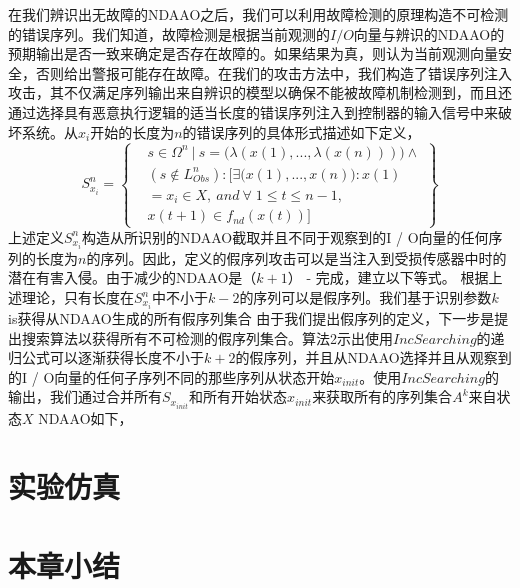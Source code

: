在我们辨识出无故障的NDAAO之后，我们可以利用故障检测的原理构造不可检测的错误序列。我们知道，故障检测是根据当前观测的$I/O$向量与辨识的NDAAO的预期输出是否一致来确定是否存在故障的。如果结果为真，则认为当前观测向量安全，否则给出警报可能存在故障。在我们的攻击方法中，我们构造了错误序列注入攻击，其不仅满足序列输出来自辨识的模型以确保不能被故障机制检测到，而且还通过选择具有恶意执行逻辑的适当长度的错误序列注入到控制器的输入信号中来破坏系统。从$ x_i $开始的长度为$ n $的错误序列的具体形式描述如下定义，
\begin{equation} 
S_{x_i}^{n}=\left\{\begin{split} &s\in \Omega^n~|~s=\big( \lambda(x(1),...,\lambda(x(n))) \big)\wedge\\
&(s\notin L_{Obs}^n):[\exists \big(x(1),...,x(n)\big): x(1)\\&=x_i\in X,~and~
\forall\;1\leq t\leq n-1,\\&x(t+1)\in f_{nd}(x(t))] \end{split} \right\} 
\end{equation}
上述定义$ S_ {x_i} ^ {n} $构造从所识别的NDAAO截取并且不同于观察到的I / O向量的任何序列的长度为$ n $的序列。因此，定义的假序列攻击可以是当注入到受损传感器中时的潜在有害入侵。由于减少的NDAAO是$（k + 1）$ - 完成，建立以下等式。
根据上述理论，只有长度在$ S_ {x_i} ^ {n} $中不小于$ k-2 $的序列可以是假序列。我们基于识别参数$ k $ is获得从NDAAO生成的所有假序列集合
由于我们提出假序列的定义，下一步是提出搜索算法以获得所有不可检测的假序列集合。算法2示出使用$ IncSearching $的递归公式可以逐渐获得长度不小于$ k + 2 $的假序列，并且从NDAAO选择并且从观察到的I / O向量的任何子序列不同的那些序列从状态开始$ x_ {init} $。使用$ IncSearching $的输出，我们通过合并所有$ S_ {x_ {init}} $和所有开始状态$ x_ {init} $来获取所有的序列集合$ A ^ k $来自状态$ X $ NDAAO如下，

\section{实验仿真}
\label{sec:simulation}

\section{本章小结}
\label{sec:insertimage}

